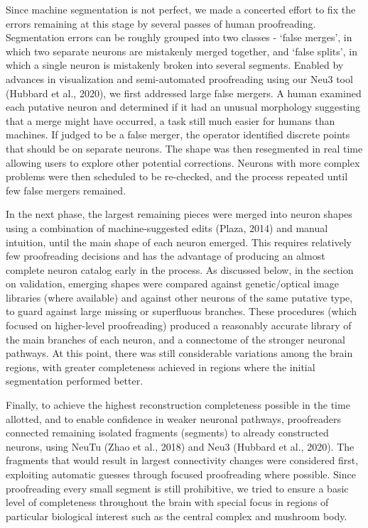 \documentclass{article}
\begin{document}
Since machine segmentation is not perfect, we made a concerted effort to fix the errors remaining at this stage by several passes of human proofreading. Segmentation errors can be roughly grouped into two classes - ‘false merges’, in which two separate neurons are mistakenly merged together, and ‘false splits’, in which a single neuron is mistakenly broken into several segments. Enabled by advances in visualization and semi-automated proofreading using our Neu3 tool (Hubbard et al., 2020), we first addressed large false mergers. A human examined each putative neuron and determined if it had an unusual morphology suggesting that a merge might have occurred, a task still much easier for humans than machines. If judged to be a false merger, the operator identified discrete points that should be on separate neurons. The shape was then resegmented in real time allowing users to explore other potential corrections. Neurons with more complex problems were then scheduled to be re-checked, and the process repeated until few false mergers remained.

In the next phase, the largest remaining pieces were merged into neuron shapes using a combination of machine-suggested edits (Plaza, 2014) and manual intuition, until the main shape of each neuron emerged. This requires relatively few proofreading decisions and has the advantage of producing an almost complete neuron catalog early in the process. As discussed below, in the section on validation, emerging shapes were compared against genetic/optical image libraries (where available) and against other neurons of the same putative type, to guard against large missing or superfluous branches. These procedures (which focused on higher-level proofreading) produced a reasonably accurate library of the main branches of each neuron, and a connectome of the stronger neuronal pathways. At this point, there was still considerable variations among the brain regions, with greater completeness achieved in regions where the initial segmentation performed better.

Finally, to achieve the highest reconstruction completeness possible in the time allotted, and to enable confidence in weaker neuronal pathways, proofreaders connected remaining isolated fragments (segments) to already constructed neurons, using NeuTu (Zhao et al., 2018) and Neu3 (Hubbard et al., 2020). The fragments that would result in largest connectivity changes were considered first, exploiting automatic guesses through focused proofreading where possible. Since proofreading every small segment is still prohibitive, we tried to ensure a basic level of completeness throughout the brain with special focus in regions of particular biological interest such as the central complex and mushroom body.
\end{document}
